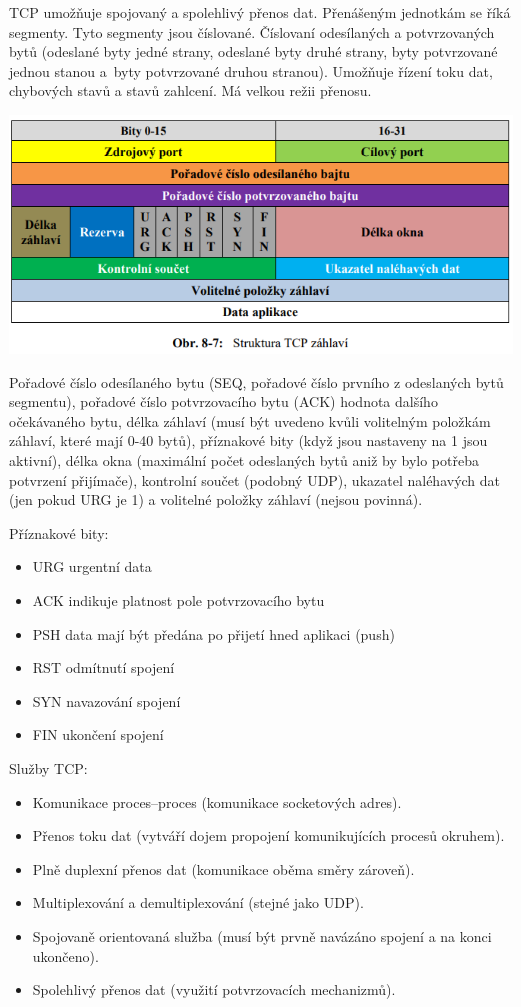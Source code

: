 TCP umožňuje spojovaný a spolehlivý přenos dat. Přenášeným jednotkám se říká segmenty. Tyto segmenty jsou číslované. Číslovaní odesílaných a potvrzovaných bytů (odeslané byty jedné strany, odeslané byty druhé strany, byty potvrzované jednou stanou a~byty potvrzované druhou stranou). Umožňuje řízení toku dat, chybových stavů a stavů zahlcení. Má velkou režii přenosu.


\begin{center}
\includegraphics[scale = 0.5]{images/-051.png}
\end{center}

Pořadové číslo odesílaného bytu (SEQ, pořadové číslo prvního z odeslaných bytů segmentu), pořadové číslo potvrzovacího bytu (ACK) hodnota dalšího očekávaného bytu, délka záhlaví (musí být uvedeno kvůli volitelným položkám záhlaví, které mají 0-40 bytů), příznakové bity (když jsou nastaveny na 1 jsou aktivní), délka okna (maximální počet odeslaných bytů aniž by bylo potřeba potvrzení přijímače), kontrolní součet (podobný UDP), ukazatel naléhavých dat (jen pokud URG je 1) a volitelné položky záhlaví (nejsou povinná).

Příznakové bity:
\begin{itemize}[noitemsep]
    \item URG urgentní data
    \item ACK indikuje platnost pole potvrzovacího bytu
    \item PSH data mají být předána po přijetí hned aplikaci (push)
    \item RST odmítnutí spojení
    \item SYN navazování spojení
    \item FIN ukončení spojení
\end{itemize}

Služby TCP:
\begin{itemize}[noitemsep]
    \item Komunikace proces--proces (komunikace socketových adres).
    \item Přenos toku dat (vytváří dojem propojení komunikujících procesů okruhem).
    \item Plně duplexní přenos dat (komunikace oběma směry zároveň).
    \item Multiplexování a demultiplexování (stejné jako UDP).
    \item Spojovaně orientovaná služba (musí být prvně navázáno spojení a na konci ukončeno).
    \item Spolehlivý přenos dat (využití potvrzovacích mechanizmů).
\end{itemize}

